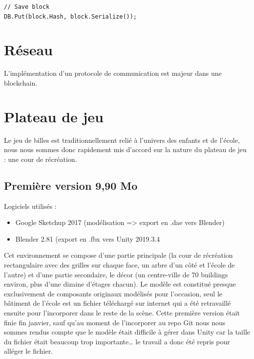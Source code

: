\documentclass{article}
\begin{document}
\begin{verbatim}
// Save block
DB.Put(block.Hash, block.Serialize());
\end{verbatim}

\section{Réseau}
L'implémentation d'un protocole de communication est majeur dans une blockchain.

\section{Plateau de jeu}
Le jeu de billes est traditionnellement relié à l’univers des enfants et de l’école, nous nous sommes donc rapidement mis d’accord sur la nature du plateau de jeu : une cour de récréation.

\subsection{Première version 9,90 Mo}
Logiciels utilisés :
\begin{itemize}
    \item Google Sketchup 2017 (modélisation => export en .dae vers Blender)
    \item Blender 2.81 (export en .fbx vers Unity 2019.3.4
\end{itemize}

Cet environnement se compose d’une partie principale (la cour de récréation rectangulaire avec des grilles sur chaque face, un arbre d’un côté et l’école de l’autre) et d’une partie 	secondaire, le décor (un centre-ville de 70 buildings environ, plus d’une dizaine d’étages 	chacun). Le modèle est constitué presque exclusivement de composants originaux modélisés pour l’occasion, seul le bâtiment de l’école est un fichier téléchargé sur internet qui a été retravaillé ensuite pour l’incorporer dans le reste de la scène. Cette première version était finie fin janvier, sauf qu’au moment de l’incorporer au repo Git nous nous sommes rendus compte que le modèle était difficile à gérer dans Unity car la taille du fichier était beaucoup trop importante… le travail a donc été repris pour alléger le fichier.
\end{document}
